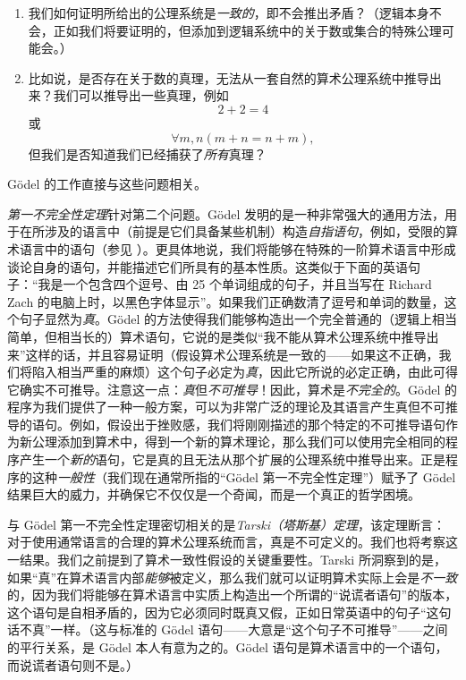 \begin{enumerate}
  \item 我们如何证明所给出的公理系统是\emph{一致的}，即不会推出矛盾？（逻辑本身不会，正如我们将要证明的，但添加到逻辑系统中的关于数或集合的特殊公理可能会。）
  \item 比如说，是否存在关于数的真理，无法从一套自然的算术公理系统中推导出来？我们可以推导出一些真理，例如 \[2+2=4\] 或 \[\forall m, n (m+n=n+m),\]但我们是否知道我们已经捕获了\emph{所有}真理？
\end{enumerate}

Gödel 的工作直接与这些问题相关。

\emph{第一不完全性定理}针对第二个问题。Gödel 发明的是一种非常强大的通用方法，用于在所涉及的语言中（前提是它们具备某些机制）构造\emph{自指语句}，例如，受限的算术语言中的语句（参见
）。更具体地说，我们将能够在特殊的一阶算术语言中形成谈论自身的语句，并能描述它们所具有的基本性质。这类似于下面的英语句子：“我是一个包含四个逗号、由 25 个单词组成的句子，并且当写在 Richard Zach 的电脑上时，以黑色字体显示”。如果我们正确数清了逗号和单词的数量，这个句子显然为\emph{真}。Gödel 的方法使得我们能够构造出一个完全普通的（逻辑上相当简单，但相当长的）算术语句，它说的是类似“我不能从算术公理系统中推导出来”这样的话，并且容易证明（假设算术公理系统是一致的——如果这不正确，我们将陷入相当严重的麻烦）这个句子必定为\emph{真}，因此它所说的必定正确，由此可得它确实不可推导。注意这一点：\emph{真}但\emph{不可推导}！因此，算术是\emph{不完全的}。Gödel 的程序为我们提供了一种一般方案，可以为非常广泛的理论及其语言产生真但不可推导的语句。例如，假设出于挫败感，我们将刚刚描述的那个特定的不可推导语句作为新公理添加到算术中，得到一个新的算术理论，那么我们可以使用完全相同的程序产生一个\emph{新的}语句，它是真的且无法从那个扩展的公理系统中推导出来。正是程序的这种\emph{一般性}（我们现在通常所指的“Gödel 第一不完全性定理”）赋予了 Gödel 结果巨大的威力，并确保它不仅仅是一个奇闻，而是一个真正的哲学困境。

与 Gödel 第一不完全性定理密切相关的是\emph{Tarski（塔斯基）定理}，该定理断言：对于使用通常语言的合理的算术公理系统而言，真是不可定义的。我们也将考察这一结果。我们之前提到了算术一致性假设的关键重要性。Tarski 所洞察到的是，如果“真”在算术语言内部\emph{能够}被定义，那么我们就可以证明算术实际上会是\emph{不一致}的，因为我们将能够在算术语言中实质上构造出一个所谓的“说谎者语句”的版本，这个语句是自相矛盾的，因为它必须同时既真又假，正如日常英语中的句子“这句话不真”一样。（这与标准的 Gödel 语句——大意是“这个句子不可推导”——之间的平行关系，是 Gödel 本人有意为之的。Gödel 语句是算术语言中的一个语句，而说谎者语句则不是。）

